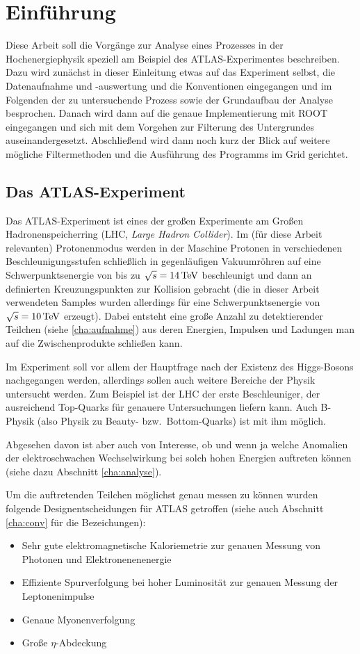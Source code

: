 \section{Einführung}
Diese Arbeit soll die Vorgänge zur Analyse eines Prozesses in der
Hochenergiephysik speziell am Beispiel des ATLAS-Experimentes beschreiben.  Dazu
wird zunächst in dieser Einleitung etwas auf das Experiment selbst, die
Datenaufnahme und -auswertung und die Konventionen eingegangen und im Folgenden
der zu untersuchende Prozess sowie der Grundaufbau der Analyse besprochen.
Danach wird dann auf die genaue Implementierung mit ROOT eingegangen und sich
mit dem Vorgehen zur Filterung des Untergrundes auseinandergesetzt. Abschließend
wird dann noch kurz der Blick auf weitere mögliche Filtermethoden und die
Ausführung des Programms im Grid gerichtet.

\subsection{Das ATLAS-Experiment}
Das ATLAS-Experiment ist eines der großen Experimente am Großen
Hadronenspeicherring (LHC, \emph{Large Hadron Collider}). Im (für diese Arbeit
relevanten) Protonenmodus werden in der Maschine Protonen in verschiedenen
Beschleunigungsstufen schließlich in gegenläufigen Vakuumröhren auf eine
Schwerpunktsenergie von bis zu $\sqrt{s} = \unit[14]{TeV}$ beschleunigt und dann
an definierten Kreuzungspunkten zur Kollision gebracht (die in dieser Arbeit
verwendeten Samples wurden allerdings für eine Schwerpunktsenergie von $\sqrt s
= \unit[10]{TeV}$ erzeugt). Dabei entsteht eine große Anzahl zu detektierender
Teilchen (siehe \ref{cha:aufnahme}) aus deren Energien, Impulsen und Ladungen
man auf die Zwischenprodukte schließen kann.

Im Experiment soll vor allem der Hauptfrage nach der Existenz des
Higgs-Bosons nachgegangen werden, allerdings sollen auch weitere Bereiche der
Physik untersucht werden. Zum Beispiel ist der LHC der erste Beschleuniger, der
ausreichend Top-Quarks für genauere Untersuchungen liefern kann. Auch B-Physik
(also Physik zu Beauty- bzw.\ Bottom-Quarks) ist mit ihm möglich.

Abgesehen davon ist aber auch von Interesse, ob und wenn ja welche Anomalien der
elektroschwachen Wechselwirkung bei solch hohen Energien auftreten können (siehe
dazu Abschnitt \ref{cha:analyse}).

Um die auftretenden Teilchen möglichst genau messen zu können wurden folgende
Designentscheidungen für ATLAS getroffen\cite{atlas-tp} (siehe auch Abschnitt
\ref{cha:conv} für die Bezeichungen):
\begin{itemize}
  \item Sehr gute elektromagnetische Kaloriemetrie zur genauen Messung von
    Photonen und Elektronenenenergie
  \item Effiziente Spurverfolgung bei hoher Luminosität zur genauen Messung der
    Leptonenimpulse
  \item Genaue Myonenverfolgung
  \item Große $\eta$-Abdeckung 
\end{itemize}

